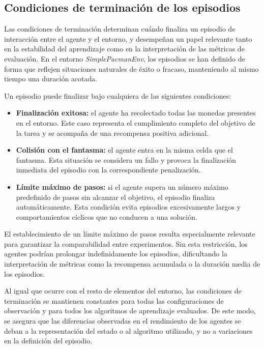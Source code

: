 \subsection{Condiciones de terminación de los episodios}

Las condiciones de terminación determinan cuándo finaliza un episodio de interacción entre el agente y el entorno, y desempeñan un papel relevante tanto en la estabilidad del aprendizaje como en la interpretación de las métricas de evaluación. En el entorno \textit{SimplePacmanEnv}, los episodios se han definido de forma que reflejen situaciones naturales de éxito o fracaso, manteniendo al mismo tiempo una duración acotada.

Un episodio puede finalizar bajo cualquiera de las siguientes condiciones:

\begin{itemize}
    \item \textbf{Finalización exitosa:} el agente ha recolectado todas las monedas presentes en el entorno. Este caso representa el cumplimiento completo del objetivo de la tarea y se acompaña de una recompensa positiva adicional.
    
    \item \textbf{Colisión con el fantasma:} el agente entra en la misma celda que el fantasma. Esta situación se considera un fallo y provoca la finalización inmediata del episodio con la correspondiente penalización.
    
    \item \textbf{Límite máximo de pasos:} si el agente supera un número máximo predefinido de pasos sin alcanzar el objetivo, el episodio finaliza automáticamente. Esta condición evita episodios excesivamente largos y comportamientos cíclicos que no conducen a una solución.
\end{itemize}

El establecimiento de un límite máximo de pasos resulta especialmente relevante para garantizar la comparabilidad entre experimentos. Sin esta restricción, los agentes podrían prolongar indefinidamente los episodios, dificultando la interpretación de métricas como la recompensa acumulada o la duración media de los episodios.

Al igual que ocurre con el resto de elementos del entorno, las condiciones de terminación se mantienen constantes para todas las configuraciones de observación y para todos los algoritmos de aprendizaje evaluados. De este modo, se asegura que las diferencias observadas en el rendimiento de los agentes se deban a la representación del estado o al algoritmo utilizado, y no a variaciones en la definición del episodio.

